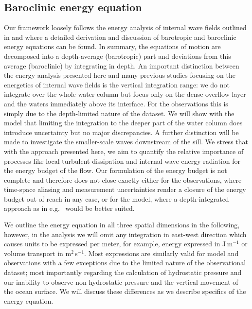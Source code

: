 \documentclass{ametsocV6.1}
\begin{document}
\subsection{Baroclinic energy equation}\label{sec:EnergyEquation}
Our framework loosely follows the energy analysis of internal wave fields outlined in \citet{kang10} and \citet{kangfringer11} where a detailed derivation and discussion of barotropic and baroclinic energy equations can be found.
In summary, the equations of motion are decomposed into a depth-average (barotropic) part and deviations from this average (baroclinic) by integrating in depth.
An important distinction between the energy analysis presented here and many previous studies focusing on the energetics of internal wave fields is the vertical integration range: we do not integrate over the whole water column but focus only on the dense overflow layer and the waters immediately above its interface.
For the observations this is simply due to the depth-limited nature of the dataset.
We will show with the model that limiting the integration to the deeper part of the water column does introduce uncertainty but no major discrepancies.
A further distinction will be made to investigate the smaller-scale waves downstream of the sill.
We stress that with the approach presented here, we aim to quantify the relative importance of processes like local turbulent dissipation and internal wave energy radiation for the energy budget of the flow.
Our formulation of the energy budget is not complete and therefore does not close exactly either for the observations, where time-space aliasing and measurement uncertainties render a closure of the energy budget out of reach in any case, or for the model, where a depth-integrated approach as in e.g.~\citet{kangfringer11} would be better suited.

We outline the energy equation in all three spatial dimensions in the following, however, in the analysis we will omit any integration in east-west direction which causes units to be expressed per meter, for example, energy expressed in J\,m$^{-1}$ or volume transport in m$^2$\,s$^{-1}$.
Most expressions are similarly valid for model and observations with a few exceptions due to the limited nature of the observational dataset; most importantly regarding the calculation of hydrostatic pressure and our inability to observe non-hydrostatic pressure and the vertical movement of the ocean surface.
We will discuss these differences as we describe specifics of the energy equation.
\end{document}
